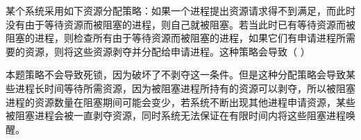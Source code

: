 \question 某个系统采用如下资源分配策略：如果一个进程提出资源请求得不到满足，而此时没有由于等待资源而被阻塞的进程，则自己就被阻塞。若当此时已有等待资源而被阻塞的进程，则检查所有由于等待资源而被阻塞的进程，如果它们有申请进程所需要的资源，则将这些资源剥夺并分配给申请进程。这种策略会导致（
）
\par{}
\begin{solution}本题策略不会导致死锁，因为破坏了不剥夺这一条件。但是这种分配策略会导致某些进程长时间等待所需资源，因为被阻塞进程所持有的资源可以剥夺，所以被阻塞进程的资源数量在阻塞期间可能会变少，若系统不断出现其他进程申请资源，某些被阻塞进程会被一直剥夺资源，同时系统无法保证在有限时间内将这些阻塞进程唤醒。
\end{solution}
